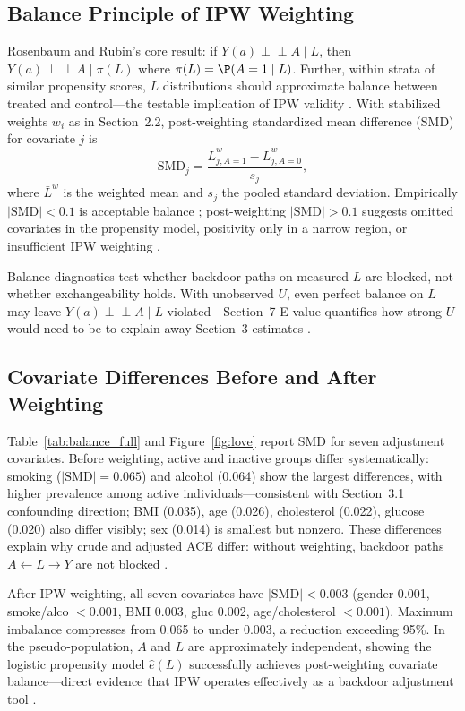 \documentclass[12pt,a4paper]{article}
\newcommand{\indep}{\perp\!\!\!\perp}
\begin{document}
\subsection{Balance Principle of IPW Weighting}

Rosenbaum and Rubin's \cite{rosenbaum1983central} core result: if $Y(a)\indep A\mid L$, then $Y(a)\indep A\mid \pi(L)$ where $\pi(L)=\P(A=1\mid L)$. Further, within strata of similar propensity scores, $L$ distributions should approximate balance between treated and control---the testable implication of IPW validity \cite{chen2024iptw}. With stabilized weights $w_i$ as in Section~2.2, post-weighting standardized mean difference (SMD) for covariate $j$ is
\[
\mathrm{SMD}_j=\frac{\bar L_{j,A=1}^{w}-\bar L_{j,A=0}^{w}}{s_j},
\]
where $\bar L^w$ is the weighted mean and $s_j$ the pooled standard deviation. Empirically $|\mathrm{SMD}|<0.1$ is acceptable balance \cite{chen2024iptw}; post-weighting $|\mathrm{SMD}|>0.1$ suggests omitted covariates in the propensity model, positivity only in a narrow region, or insufficient IPW weighting \cite{chen2024iptw,hernan2024whatif}.

Balance diagnostics test whether backdoor paths on measured $L$ are blocked, not whether exchangeability holds. With unobserved $U$, even perfect balance on $L$ may leave $Y(a)\indep A\mid L$ violated---Section~7 E-value quantifies how strong $U$ would need to be to explain away Section~3 estimates \cite{vanderweele2017evalue}.

\Needspace{14cm}
\subsection{Covariate Differences Before and After Weighting}

Table~\ref{tab:balance_full} and Figure~\ref{fig:love} report SMD for seven adjustment covariates. Before weighting, active and inactive groups differ systematically: smoking ($|\mathrm{SMD}|=0.065$) and alcohol (0.064) show the largest differences, with higher prevalence among active individuals---consistent with Section~3.1 confounding direction; BMI (0.035), age (0.026), cholesterol (0.022), glucose (0.020) also differ visibly; sex (0.014) is smallest but nonzero. These differences explain why crude and adjusted ACE differ: without weighting, backdoor paths $A\leftarrow L\to Y$ are not blocked \cite{hernan2024whatif}.

After IPW weighting, all seven covariates have $|\mathrm{SMD}|<0.003$ (gender 0.001, smoke/alco $<0.001$, BMI 0.003, gluc 0.002, age/cholesterol $<0.001$). Maximum imbalance compresses from 0.065 to under 0.003, a reduction exceeding 95\%. In the pseudo-population, $A$ and $L$ are approximately independent, showing the logistic propensity model $\hat e(L)$ successfully achieves post-weighting covariate balance---direct evidence that IPW operates effectively as a backdoor adjustment tool \cite{chen2024iptw}.
\end{document}
